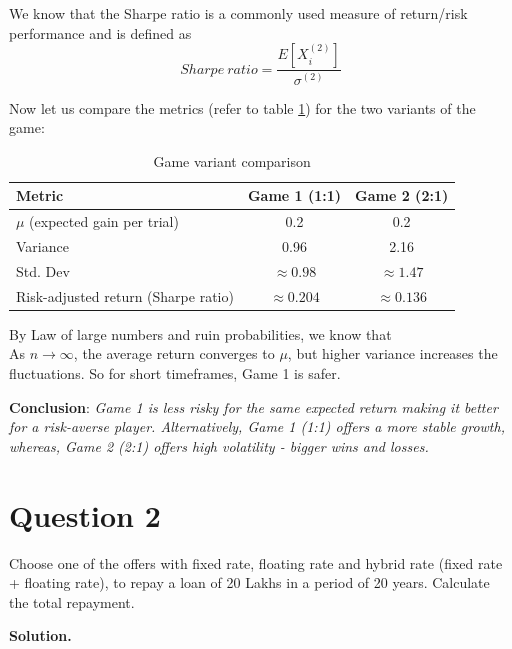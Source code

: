 We know that the Sharpe ratio is a commonly used measure of return/risk performance and is defined as
\[Sharpe\ ratio = \frac{E[X_i^{(2)}]}{\sigma^{(2)}}\]

Now let us compare the metrics (refer to table \ref{tab:comparison-table}) for the two variants of the game:

\begin{table}[h]
    \centering
    \begin{tabular}{l|cc}
         \toprule
         \textbf{Metric} & \textbf{Game 1 (1:1)} & \textbf{Game 2 (2:1)} \\
         \midrule
         $\mu$ (expected gain per trial) & 0.2 & 0.2\\
         Variance & 0.96 & 2.16\\
         Std. Dev & $\approx0.98$ & $\approx1.47$\\
         Risk-adjusted return (Sharpe ratio) & $\approx0.204$ & $\approx0.136$\\
         \bottomrule
    \end{tabular}
    \caption{Game variant comparison}
    \label{tab:comparison-table}
\end{table}

By Law of large numbers and ruin probabilities, we know that\\
As $n \rightarrow \infty$, the average return converges to $\mu$, but higher variance increases the fluctuations. So for short timeframes, Game 1 is safer.

\textbf{Conclusion}: \textit{Game 1 is less risky for the same expected return making it better for a risk-averse player. Alternatively, Game 1 (1:1) offers a more stable growth, whereas, Game 2 (2:1) offers high volatility - bigger wins and losses.}





\section*{Question 2}
Choose one of the offers with fixed rate, floating rate and hybrid rate (fixed rate + floating rate), to repay a loan of 20 Lakhs in a period of 20 years.
Calculate the total repayment.

\textbf{Solution.}\\



